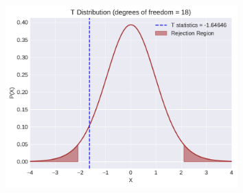 \documentclass[a4paper,10pt,openright]{report}
\begin{document}
\begin{enumerate}
\begin{figure}[ht!]
\includegraphics[width=14cm,height=7cm,keepaspectratio]{ttest2.pdf}
\centering
\end{figure}

\end{enumerate}
\end{document}
